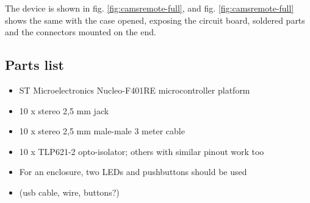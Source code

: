 The device is shown in fig. \ref{fig:camsremote-full}, and fig. \ref{fig:camsremote-full} shows the same with the case opened, exposing the circuit board, soldered parts and the connectors mounted on the end.

\subsection{Parts list}

\begin{itemize}
	\item ST Microelectronics Nucleo-F401RE microcontroller platform
	\item 10 x stereo 2,5 mm jack
	\item 10 x stereo 2,5 mm male-male 3 meter cable
	\item 10 x TLP621-2 opto-isolator; others with similar pinout work too
	\item For an enclosure, two LEDs and pushbuttons should be used
	\item (usb cable, wire, buttons?)
\end{itemize}
